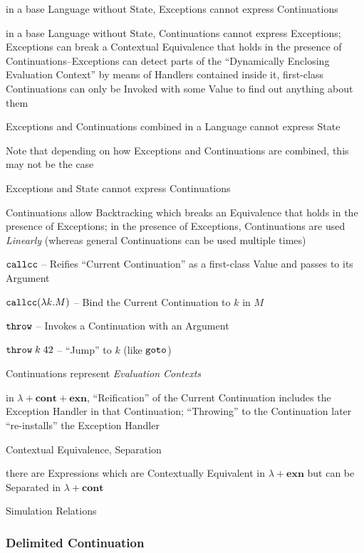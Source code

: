 in a base Language without State, Exceptions cannot express Continuations

in a base Language without State, Continuations cannot express Exceptions;
Exceptions can break a Contextual Equivalence that holds in the presence of
Continuations--Exceptions can detect parts of the ``Dynamically Enclosing
Evaluation Context'' by means of Handlers contained inside it, first-class
Continuations can only be Invoked with some Value to find out anything about
them

Exceptions and Continuations combined in a Language cannot express State

\fist Note that depending on how Exceptions and Continuations are combined, this
may not be the case

Exceptions and State cannot express Continuations

Continuations allow Backtracking which breaks an Equivalence that holds in the
presence of Exceptions; in the presence of Exceptions, Continuations are used
\emph{Linearly} (whereas general Continuations can be used multiple times)

$\mathtt{callcc}$ -- Reifies ``Current Continuation'' as a first-class Value and passes
to its Argument %

$\mathtt{callcc}(\lambda k.M)$ -- Bind the Current Continuation to $k$ in $M$

$\mathtt{throw}$ -- Invokes a Continuation with an Argument

$\mathtt{throw}\;k\;42$ -- ``Jump'' to $k$ (like $\mathtt{goto}$)

Continuations represent \emph{Evaluation Contexts}

in $\lambda + \mathbf{cont} + \mathbf{exn}$, ``Reification'' of the Current
Continuation includes the Exception Handler in that Continuation; ``Throwing''
to the Continuation later ``re-installs'' the Exception Handler

Contextual Equivalence, Separation %

there are Expressions which are Contextually Equivalent in
$\lambda + \mathbf{exn}$ but can be Separated in $\lambda + \mathbf{cont}$

Simulation Relations



\subsubsection{Delimited Continuation}\label{sec:delimited_continuation}

